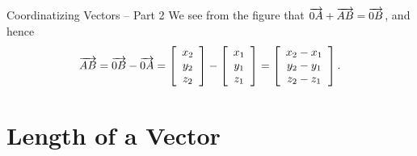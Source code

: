 \documentclass[pdf]{beamer}
\begin{document}
{{\begin{block}{Coordinatizing Vectors -- Part 2}
We see from the figure that
$\overrightarrow{0A} + \overrightarrow{AB}=\overrightarrow{0B}$,
and hence
\[
\overrightarrow{AB} = \overrightarrow{0B}-\overrightarrow{0A} 
= 
\left[\begin{array}{c} x_2 \\ y_2 \\ z_2 \end{array}\right] 
-
\left[\begin{array}{c} x_1 \\ y_1 \\ z_1 \end{array}\right] 
=
\left[\begin{array}{c} x_2 -x_1 \\ y_2 -y_1 \\ z_2 -z_1 \end{array}\right].
\]
\end{block}
}

\section{Length of a Vector}
}
\end{document}
